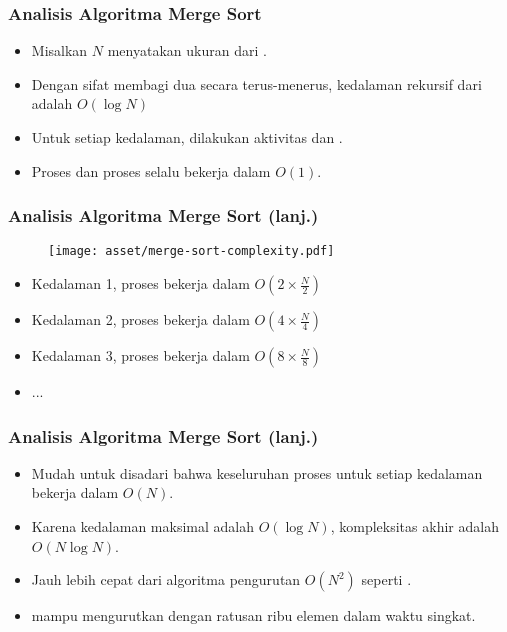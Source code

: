 \begin{frame}
\frametitle{Analisis Algoritma Merge Sort}
\begin{itemize}
  \item Misalkan $N$ menyatakan ukuran dari \farray.
  \item Dengan sifat membagi dua secara terus-menerus, kedalaman rekursif dari \fmergeSort adalah $O(\log{N})$
  \item Untuk setiap kedalaman, dilakukan aktivitas  dan .
  \item Proses  dan proses  selalu bekerja dalam $O(1)$.
\end{itemize}
\end{frame}

\begin{frame}
\frametitle{Analisis Algoritma Merge Sort (lanj.)}
\begin{figure}
  \centering
  \texttt{[image: asset/merge-sort-complexity.pdf]}
\end{figure}
\begin{itemize}
  \item Kedalaman 1, proses  bekerja dalam $O(2 \times \frac{N}{2})$
  \item Kedalaman 2, proses  bekerja dalam $O(4 \times \frac{N}{4})$
  \item Kedalaman 3, proses  bekerja dalam $O(8 \times \frac{N}{8})$
  \item ...
\end{itemize}
\end{frame}

\begin{frame}
\frametitle{Analisis Algoritma Merge Sort (lanj.)}
\begin{itemize}
  \item Mudah untuk disadari bahwa keseluruhan proses untuk setiap kedalaman bekerja dalam $O(N)$.
  \item Karena kedalaman maksimal adalah $O(\log{N})$, kompleksitas akhir \fmergeSort adalah $O(N \log{N})$.
  \item Jauh lebih cepat dari algoritma pengurutan $O(N^2)$ seperti .
  \item \fMergeSort mampu mengurutkan \farray dengan ratusan ribu elemen dalam waktu singkat.
\end{itemize}
\end{frame}

